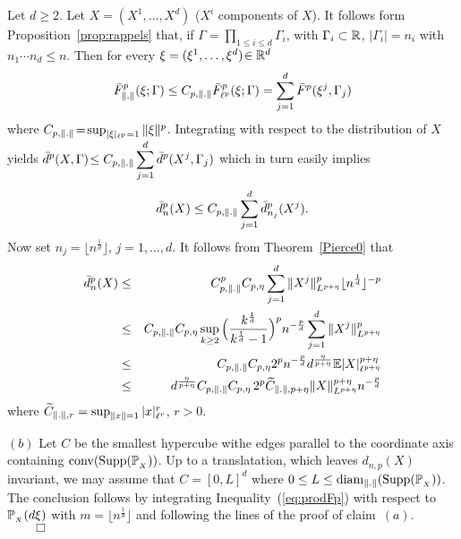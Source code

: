 % 
% 
Let $d\ge 2$. Let  $X=(X^1,\ldots,X^d)$ ($X^i$ components of $X$).   It follows form Proposition~\ref{prop:rappels}
 that, if $\Gamma=\prod_{1\le i \le d} \Gamma_i$, with $\Gamma_i\subset \mathbb{R}$, $|\Gamma_i|=n_i$ with $n_1\cdots n_d\le n$. Then for every $\xi=(\xi^1,\ldots,\xi^d)\!\in \mathbb{R}^d$
 \[
  \bar F^p_{\lVert.\rVert}(\xi;\Gamma) \le C_{p, \lVert.\rVert}\bar F^{p}_{\ell^p}(\xi;\Gamma) = \sum_{j=1}^d\bar F^p(\xi^j, \Gamma_j) 
 \]
where $C_{p,\lVert.\rVert}\!=\! \sup_{|\xi|_{\ell^p}=1}\|\xi\|^p$. Integrating with respect to the distribution of $X$ yields  $\displaystyle \bar d^p (X,\Gamma)\!\le C_{p, \lVert.\rVert} \sum_{j=1}^d \bar d^p(X^j, \Gamma_j)$ 
which in turn easily implies  
\[
\bar d_n^p(X)\le C_{p, \lVert.\rVert} \sum_{j=1}^d \bar d_{n_j}^p(X^j). 
\]
Now set $n_j = \lfloor n^{\frac 1d}\rfloor$, $j=1,\ldots,d$. It follows from Theorem~\ref{Pierce0} that
%
 \begin{eqnarray*}
 \bar  d_{n}^p(X) & \le &  C^p_{p, \lVert.\rVert}C_{p,\eta}  \sum_{j=1}^d \|X^{j}\|^p_{L^{p+\eta}}\lfloor n^{\frac 1d}\rfloor^{-p} \\
 & \le &  C_{p, \lVert.\rVert} C_{p,\eta} \sup_{k\ge 2}\Big(\frac{k^{\frac 1d}}{k^{\frac 1d}-1}\Big)^p n^{-\frac pd} \sum_{j=1}^d \|X^{j}\|^p_{L^{p+\eta}}\\
& \le &  C_{p, \lVert.\rVert} C_{p,\eta} 2^p n^{-\frac pd}d^{\frac{\eta}{p+\eta}}\mathbb{E} |X|^{p+\eta}_{\ell^{p+\eta}}\\
&\le&  d^{\frac{\eta}{p+\eta}} C_{p, \lVert.\rVert} C_{p,\eta} \,2^p \widetilde C_{\lVert.\rVert, p+\eta}  \|X\|_{L^{p+\eta}}^{p+\eta}n^{-\frac pd}
 \end{eqnarray*}
 where $\widetilde C_{\lVert.\rVert, r}=\sup_{\|x\|=1}|x |^r_{\ell^r}$, $r>0$. 
 
\smallskip
\noindent $(b)$ Let $C$ be  the smallest hypercube withe edges
parallel to the coordinate axis containing $\operatorname{conv}({\rm Supp}(\mathbb{P}_{_X}))$. Up
to a translatation, which  leaves $d_{n,p}(X)$ invariant, we may assume that $C=[0,L]^d$ where $0\le L\le {\rm diam}_{\lVert.\rVert}({\rm Supp}(\mathbb{P}_{_X}))$. The conclusion follows by integrating Inequality~(\ref{eq:prodFp}) with respect to $\mathbb{P}_{_X}(d\xi)$ with $m=\lfloor n^{\frac 1d} \rfloor$ and following the lines of the proof of claim~$(a)$. $\qquad \Box$ 
 

 
